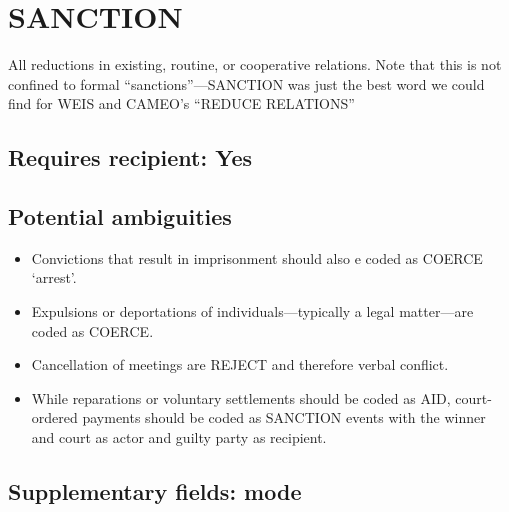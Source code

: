 \documentclass[11pt]{report}
\newcommand{\plcat}[1]{\textsf{#1}}
\begin{document}
\newpage

\section{SANCTION}

All reductions in existing, routine, or cooperative relations. Note that this is not confined to formal ``sanctions''---\plcat{SANCTION} was just the best word we could find for WEIS and CAMEO's ``REDUCE RELATIONS''


\subsection{Requires recipient: Yes}

\subsection{Potential ambiguities}

\begin{itemize}
\item Convictions that result in imprisonment should also e coded as \plcat{COERCE} `arrest'.
\item Expulsions or deportations of individuals---typically a legal matter---are coded as \plcat{COERCE}.
\item Cancellation of meetings are \plcat{REJECT} and therefore verbal conflict.
\item While reparations or voluntary settlements should be coded as \plcat{AID}, court-ordered payments should be coded as \plcat{SANCTION} events with the winner and court as actor and guilty party as recipient.
\end{itemize}

\subsection{Supplementary fields: mode}
\end{document}

